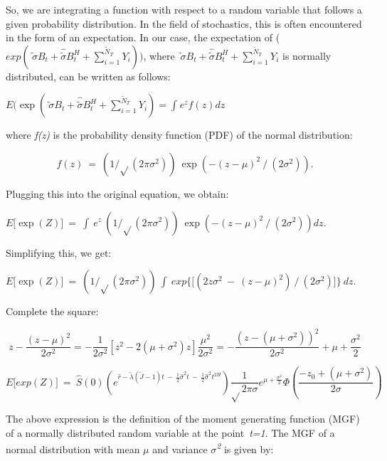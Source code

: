 \documentclass[12pt,a4paper]{report}
\numberwithin{equation}{section}
\begin{document}
So, we are integrating a function with respect to a random variable that
follows a given probability distribution. In the field of stochastics,
this is often encountered in the form of an expectation. In our case,
the expectation of
(\(exp(\widetilde{\ \sigma}B_{t} + \widehat{\widetilde{\sigma}}B_{t}^{H} + \sum_{i = 1}^{{\widetilde{N}}_{T}}Y_{i}))\),
where
\(\widetilde{\ \sigma}B_{t} + \widehat{\widetilde{\sigma}}B_{t}^{H} + \sum_{i = 1}^{{\widetilde{N}}_{T}}Y_{i}\)
is normally distributed, can be written as follows:

\(E(\exp\left( \widetilde{\ \sigma}B_{t} + \widehat{\widetilde{\sigma}}B_{t}^{H} + \sum_{i = 1}^{{\widetilde{N}}_{T}}Y_{i} \right) = \int_{}^{}{e^{z}f(z)dz}\)

where \emph{f(z)} is the probability density function (PDF) of the
normal distribution:

\[f(z)\  = \ (1/\sqrt{}(2\pi\sigma^{2}))\ \exp( - {(z - \mu)}^{2}\ /\ (2\sigma^{2})).\]

Plugging this into the original equation, we obtain:

\(E\lbrack \exp(Z)\rbrack\  = \ \int\ e^{z}\ (1/\sqrt{}(2\pi\sigma^{2}))\ \exp( - {(z - \mu)}^{2}\ /\ (2\sigma^{2}))dz\).

Simplifying this, we get:

\(E\lbrack \exp(Z)\rbrack\  = \ (1/\sqrt{}(2\pi\sigma^{2}))\ \int\ exp\{\lbrack(2z\sigma^{2}\  - \ {(z - \mu)}^{2})\ /\ (2\sigma^{2})\rbrack\}\ dz\).

Complete the square:

\[z - \frac{(z - \mu)^{2}}{2\sigma^{2}} = - \frac{1}{2\sigma^{2}}\left\lbrack z^{2} - 2\left( \mu + \sigma^{2} \right)z \right\rbrack\frac{\mu^{2}}{2\sigma^{2}} = - \frac{\left( z - \left( \mu + \sigma^{2} \right) \right)^{2}}{2\sigma^{2}} + \mu + \frac{\sigma^{2}}{2}\]

\[E\lbrack exp(Z)\rbrack\  = \ \widehat{S}(0)\left( e^{\widehat{r} - \widetilde{\lambda}\left( \widetilde{J} - 1 \right)t\  - \ \frac{1}{2}{\widehat{\sigma}}^{2}t\  - \ \frac{1}{2}{\widehat{\sigma}}^{2}t^{2H}} \right)\frac{1}{\sqrt{}2\pi\sigma}e^{\mu + \frac{\sigma^{2}}{2}}\Phi\left( \frac{- z_{0} + \left( \mu + \sigma^{2} \right)}{2\sigma} \right)\]


The above expression is the definition of the moment generating function
(MGF) of a normally distributed random variable at the point~\emph{t=1}.
The MGF of a normal distribution with mean \emph{$\mu$} and variance
\emph{$\sigma$\textsuperscript{2}} is given by:
\end{document}
